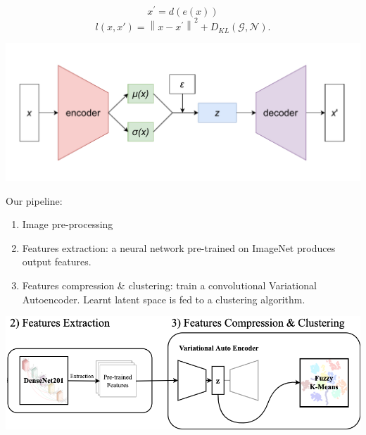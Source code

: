 \documentclass[ICVSS,portrait,final]{baposter}
\begin{document}
\begin{poster}
{\begin{small}
	\begin{equation*}
		x^\prime = d(e(x))
	\end{equation*}
	\begin{equation*}
		l(x,x')=\left\lVert x - x^\prime \right\rVert^2 + D_{KL}(\mathcal{G}, \mathcal{N}).
	\end{equation*}
\end{small}
	\includegraphics[width=1.0\linewidth]{images/VAE.pdf}
	\label{fig:VAE}

\noindent Our pipeline:
\begin{enumerate}
	\item Image pre-processing
	\item Features extraction: a neural network pre-trained on ImageNet produces output features.
	\item Features compression \& clustering: train a convolutional Variational Autoencoder. Learnt latent space is fed to a clustering algorithm.
\end{enumerate}



\begin{center}
	\includegraphics[width=1.0\linewidth]{images/pipeline.png}
	\label{fig:Pipeline}
\end{center}
  \vspace{0.3em}
 }





\end{poster}
\end{document}
